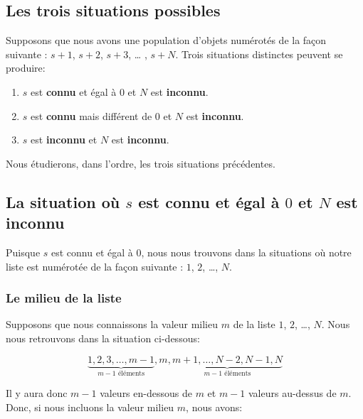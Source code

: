 \documentclass[10pt]{article}
\begin{document}
\hypertarget{les-trois-situations-possibles}{%
\subsection{Les trois situations
possibles}\label{les-trois-situations-possibles}}

Supposons que nous avons une population d'objets numérotés de la façon
suivante : \(s+1\), \(s+2\), \(s+3\), \ldots{} , \(s+N\). Trois
situations distinctes peuvent se produire:

\begin{enumerate}
\def\labelenumi{\arabic{enumi}.}
\item
  \(s\) est \textbf{connu} et égal à \(0\) et \(N\) est
  \textbf{inconnu}.
\item
  \(s\) est \textbf{connu} mais différent de \(0\) et \(N\) est
  \textbf{inconnu}.
\item
  \(s\) est \textbf{inconnu} et \(N\) est \textbf{inconnu}.
\end{enumerate}

Nous étudierons, dans l'ordre, les trois situations précédentes.

\hypertarget{la-situation-ou-s-est-connu-et-egal-a-0-et-n-est-inconnu}{%
\subsection{\texorpdfstring{La situation où \(s\) est \textbf{connu} et
égal à \(0\) et \(N\) est
\textbf{inconnu}}{La situation où s est connu et égal à 0 et N est inconnu}}\label{la-situation-ou-s-est-connu-et-egal-a-0-et-n-est-inconnu}}

Puisque \(s\) est connu et égal à \(0\), nous nous trouvons dans la
situations où notre liste est numérotée de la façon suivante : \(1\),
\(2\), \ldots{}, \(N\).

\hypertarget{le-milieu-de-la-liste}{%
\subsubsection{Le milieu de la liste}\label{le-milieu-de-la-liste}}

Supposons que nous connaissons la valeur milieu \(m\) de la liste \(1\),
\(2\), \ldots{}, \(N\). Nous nous retrouvons dans la situation
ci-dessous:

\[\underbrace{1,2,3,\ldots,m-1}_{m-1 \text{ éléments}},m,\underbrace{m+1,\ldots,N-2,N-1,N}_{m-1 \text{ éléments}}\]

Il y aura donc \(m-1\) valeurs en-dessous de \(m\) et \(m-1\) valeurs
au-dessus de \(m\). Donc, si nous incluons la valeur milieu \(m\), nous
avons:
\end{document}
